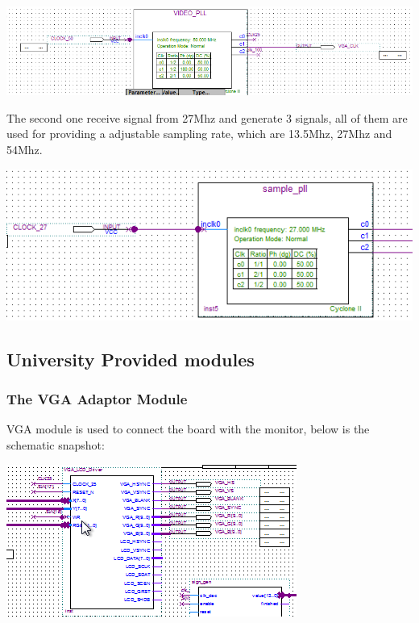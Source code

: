 \documentclass[11pt]{scrartcl}
\begin{document}
\begin{minipage}[t]{\linewidth}

{
\includegraphics[scale = 0.5]{pll1.png}
}
\end{minipage}
\medskip

The second one receive signal from 27Mhz and generate 3 signals, all of them are used for providing a adjustable sampling rate, which are 13.5Mhz, 27Mhz and 54Mhz. 

\begin{minipage}[t]{\linewidth}

{
\includegraphics[scale = 0.5]{pll2.png}
}
\end{minipage}
\medskip

\subsection{University Provided modules}
\subsubsection{The VGA Adaptor Module}

VGA module is used to connect the board with the monitor, below is the schematic snapshot:

\begin{minipage}[t]{\linewidth}

{
\includegraphics[scale = 1]{vga.png}
}
\end{minipage}
\medskip
\end{document}
